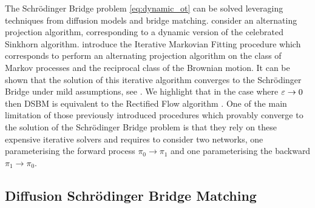 \documentclass{article}
\begin{document}
 The Schr\"odinger Bridge problem \eqref{eq:dynamic_ot} can be solved leveraging techniques from diffusion models and bridge matching. \cite{debortoli2021diffusion,vargas2021solving} consider an alternating projection algorithm, corresponding to a dynamic version of the celebrated Sinkhorn algorithm. \cite{peluchetti_diffusion_2023,shi2023DSBM} introduce the Iterative Markovian Fitting procedure which corresponds to perform an alternating projection algorithm on the class of Markov processes and the reciprocal class of the Brownian motion. It can be shown that the solution of this iterative algorithm converges to the Schr\"odinger Bridge under mild assumptions, see \citep{peluchetti_diffusion_2023,shi2023DSBM}. We highlight that in the case where $\varepsilon \to 0$ then DSBM is equivalent to the Rectified Flow algorithm \citep{liu_flow_2023}. One of the main limitation of those previously introduced procedures which provably converge to the solution of the Schr\"odinger Bridge problem is that they rely on these expensive iterative solvers and requires to consider two networks, one parameterising the forward process $\pi_0 \to \pi_1$ and one parameterising the backward $\pi_1 \to \pi_0$. 


\subsection{Diffusion Schr\"odinger Bridge Matching}
\label{sec:sec:dsbm_appendix}
\end{document}
